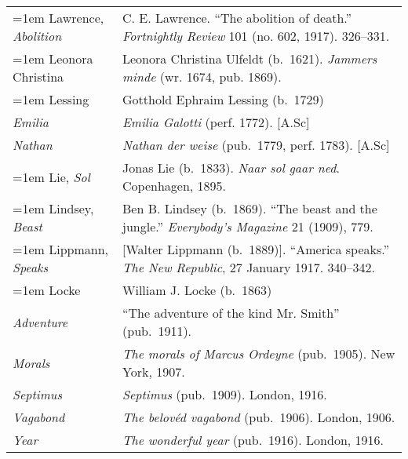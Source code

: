 \begin{xltabular}{\textwidth}{ lQ }
\hangindent=1em  Lawrence, \textit{Abolition} & C. E. Lawrence. ``The abolition of death.'' \textit{Fortnightly Review} 101 (no. 602, 1917). 326--331. \\

\hangindent=1em  Leonora Christina & Leonora Christina Ulfeldt (b.~1621). \textit{Jammers minde} (wr. 1674, pub. 1869). \\

\pagebreak
\hangindent=1em  Lessing & Gotthold Ephraim Lessing (b.~1729) \\
\hspace{1em}\textit{Emilia} & \textit{Emilia Galotti} (perf. 1772). [A.Sc]\\
\hspace{1em}\textit{Nathan} & \textit{Nathan der weise} (pub.~1779, perf. 1783). [A.Sc] \\

\hangindent=1em  Lie, \textit{Sol} & Jonas Lie (b.~1833). \textit{Naar sol gaar ned}. Copenhagen, 1895.\\

\hangindent=1em  Lindsey, \textit{Beast} & Ben B. Lindsey (b.~1869). ``The beast and the jungle.'' \textit{Everybody's Magazine} 21 (1909), 779. \\ %

\hangindent=1em  Lippmann, \textit{Speaks} & [Walter Lippmann (b.~1889)]. ``America speaks.'' \textit{The New Republic}, 27 January 1917. 340--342. \\

\hangindent=1em  Locke & William J. Locke (b.~1863) \\
\hspace{1em}\textit{Adventure} & ``The adventure of the kind Mr. Smith'' (pub.~1911). \\
\hspace{1em}\textit{Morals} & \textit{The morals of Marcus Ordeyne} (pub.~1905). New York, 1907. \\ %
\hspace{1em}\textit{Septimus} & \textit{Septimus} (pub.~1909). London, 1916. \\
\hspace{1em}\textit{Vagabond} & \textit{The belovéd vagabond} (pub.~1906). London, 1906. \\ %
\hspace{1em}\textit{Year} & \textit{The wonderful year} (pub.~1916). London, 1916. \\


\end{xltabular}
